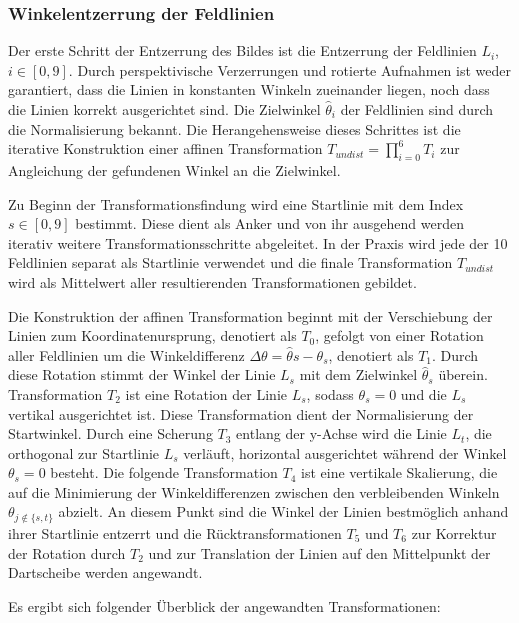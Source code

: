 \subsubsection{Winkelentzerrung der Feldlinien}
\label{sec:impl:cv:orient:angles}

Der erste Schritt der Entzerrung des Bildes ist die Entzerrung der Feldlinien $L_i$, $i\in[0, 9]$. Durch perspektivische Verzerrungen und rotierte Aufnahmen ist weder garantiert, dass die Linien in konstanten Winkeln zueinander liegen, noch dass die Linien korrekt ausgerichtet sind. Die Zielwinkel $\hat{\theta}_i$ der Feldlinien sind durch die Normalisierung bekannt. Die Herangehensweise dieses Schrittes ist die iterative Konstruktion einer affinen Transformation $T_{undist} = \prod_{i=0}^{6}T_i$ zur Angleichung der gefundenen Winkel an die Zielwinkel.

Zu Beginn der Transformationsfindung wird eine Startlinie mit dem Index $s \in [0, 9]$ bestimmt. Diese dient als Anker und von ihr ausgehend werden iterativ weitere Transformationsschritte abgeleitet. In der Praxis wird jede der 10 Feldlinien separat als Startlinie verwendet und die finale Transformation $T_{undist}$ wird als Mittelwert aller resultierenden Transformationen gebildet.

Die Konstruktion der affinen Transformation beginnt mit der Verschiebung der Linien zum Koordinatenursprung, denotiert als $T_0$, gefolgt von einer Rotation aller Feldlinien um die Winkeldifferenz $\Delta \theta = \hat\theta{s} - \theta_s$, denotiert als $T_1$. Durch diese Rotation stimmt der Winkel der Linie $L_s$ mit dem Zielwinkel $\hat{\theta}_s$ überein. Transformation $T_2$ ist eine Rotation der Linie $L_s$, sodass $\theta_s = 0$ und die $L_s$ vertikal ausgerichtet ist. Diese Transformation dient der Normalisierung der Startwinkel. Durch eine Scherung $T_3$ entlang der y-Achse wird die Linie $L_t$, die orthogonal zur Startlinie $L_s$ verläuft, horizontal ausgerichtet während der Winkel $\theta_s = 0$ besteht. Die folgende Transformation $T_4$ ist eine vertikale Skalierung, die auf die Minimierung der Winkeldifferenzen zwischen den verbleibenden Winkeln $\theta_{j \notin \{s, t\}}$ abzielt. An diesem Punkt sind die Winkel der Linien bestmöglich anhand ihrer Startlinie entzerrt und die Rücktransformationen $T_5$ und $T_6$ zur Korrektur der Rotation durch $T_2$ und zur Translation der Linien auf den Mittelpunkt der Dartscheibe werden angewandt.

Es ergibt sich folgender Überblick der angewandten Transformationen:

